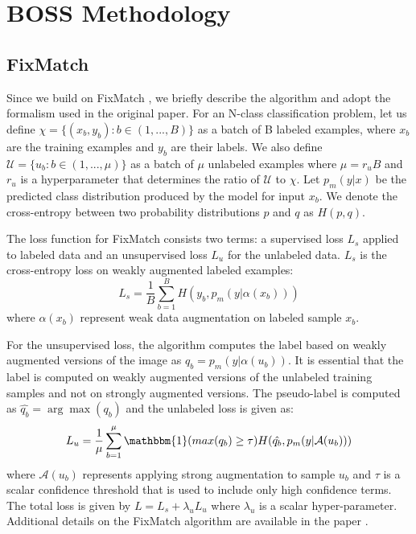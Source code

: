 \documentclass[final]{cvpr}
\newcommand{\FM}{FixMatch }
\begin{document}
\section{BOSS Methodology}
\label{sec:BOSS}

\subsection{FixMatch}
\label{sec:fixmatch}

Since we build on FixMatch \cite{sohn2020fixmatch}, we briefly describe the algorithm and adopt the formalism used in the original paper.
For an N-class classification problem, let us define $ \chi = \{ (x_b, y_b) : b \in (1, . . . , B)  \}  $ as a batch of B labeled examples, where $x_b$ are the training examples and $y_b$ are their labels. 
We also define $ \mathcal{U} = \{ u_b : b \in (1, . . . , \mu) \}$ as a batch of $\mu$ unlabeled examples where $\mu = r_u B $ and $r_u$ is a hyperparameter that determines the ratio of $\mathcal{U}$ to $\chi$. 
Let $p_m(y | x)$ be the predicted class distribution produced by the model for input $x_b$. 
We denote the cross-entropy between two probability distributions $p$ and $q$ as $H(p, q)$. 

The loss function for FixMatch consists two terms: a supervised loss $L_s$ applied to labeled data and an unsupervised loss $L_u$ for the unlabeled data. 
$L_s $ is the cross-entropy loss on weakly augmented labeled examples:
\begin{equation}
L_s = \frac{1}{B} \sum_{b=1}^{B} H(y_b, p_m (y|\alpha(x_b)))
\label{eqn:supervised}
\end{equation}
where $\alpha(x_b)$ represent weak data augmentation on labeled sample $x_b$.

For the unsupervised loss, the algorithm computes the label based on weakly augmented versions of the image as $q_b = p_m(y|\alpha(u_b))$.
It is essential that the label is computed on weakly augmented versions of the unlabeled training samples and not on strongly augmented versions.
The pseudo-label is computed as $\hat{q_b} = \arg\max(q_b)$ and the unlabeled loss is given as:
\begin{equation}
L_u = \frac{1}{\mu} \sum_{b=1}^{\mu} \mathbbm{1}  (max( q_b ) \geq \tau ) H(\hat{q_b}, p_m(y| \mathcal{A}(u_b)))
\label{eqn:Lu1}
\end{equation}
where $\mathcal{A}(u_b)$ represents applying strong augmentation to sample $u_b$ and $\tau$ is a scalar confidence threshold that is used to include only high confidence terms.
The total loss is given by $ L = L_s + \lambda_u L_u$ where $\lambda_u$ is a scalar hyper-parameter.
Additional details on the \FM algorithm are available in the paper \cite{sohn2020fixmatch}.
\end{document}
